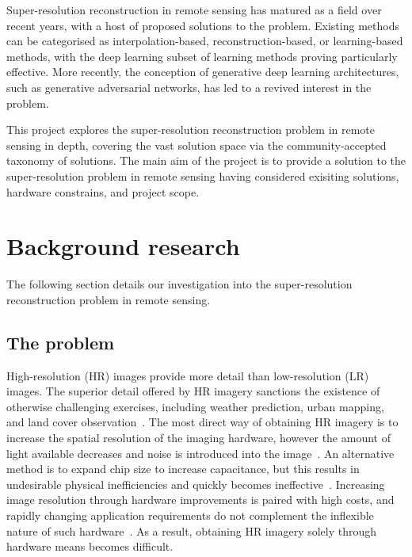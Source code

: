 Super-resolution reconstruction in remote sensing has matured as a field over recent years, with a host of proposed solutions to the problem. Existing methods can be categorised as interpolation-based, reconstruction-based, or learning-based methods, with the deep learning subset of learning methods proving particularly effective. More recently, the conception of generative deep learning architectures, such as generative adversarial networks, has led to a revived interest in the problem.

This project explores the super-resolution reconstruction problem in remote sensing in depth, covering the vast solution space via the community-accepted taxonomy of solutions. The main aim of the project is to provide a solution to the super-resolution problem in remote sensing having considered exisiting solutions, hardware constrains, and project scope.

\clearpage
\section{Background research}\label{sec:background_research}
The following section details our investigation into the super-resolution reconstruction problem in remote sensing.

\subsection{The problem}\label{subsec:the_problem}
High-resolution (HR) images provide more detail than low-resolution (LR) images. The superior detail offered by HR imagery sanctions the existence of otherwise challenging exercises, including weather prediction, urban mapping, and land cover observation~\cite{urbanMapping, mapping, cloudCover, vegetationMapping}. The most direct way of obtaining HR imagery is to increase the spatial resolution of the imaging hardware, however the amount of light available decreases and noise is introduced into the image~\cite{superResOverview}. An alternative method is to expand chip size to increase capacitance, but this results in undesirable physical inefficiencies and quickly becomes ineffective~\cite{superResOverview}. Increasing image resolution through hardware improvements is paired with high costs, and rapidly changing application requirements do not complement the inflexible nature of such hardware~\cite{ref}. As a result, obtaining HR imagery solely through hardware means becomes difficult.

